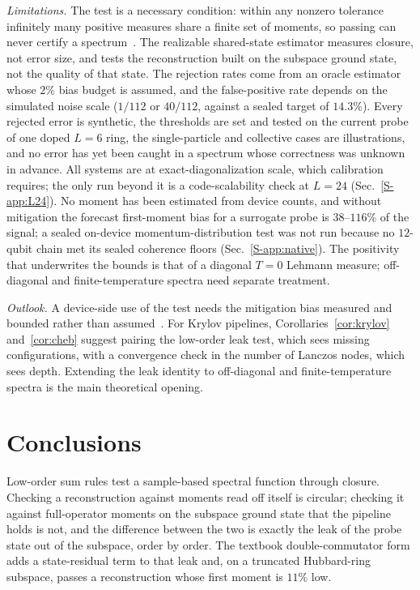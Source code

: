 \documentclass[aps,prb,reprint,onecolumn,12pt,superscriptaddress,longbibliography,floatfix]{revtex4-2}
\begin{document}
\emph{Limitations.}
\label{sec:limitlist}
The test is a necessary condition: within any nonzero tolerance infinitely many positive measures share a finite set of moments, so passing can never certify a spectrum~\cite{ShohatTamarkin1943,Akhiezer1965}. The realizable shared-state estimator measures closure, not error size, and tests the reconstruction built on the subspace ground state, not the quality of that state. The rejection rates come from an oracle estimator whose $2\%$ bias budget is assumed, and the false-positive rate depends on the simulated noise scale ($1/112$ or $40/112$, against a sealed target of $14.3\%$). Every rejected error is synthetic, the thresholds are set and tested on the current probe of one doped $L=6$ ring, the single-particle and collective cases are illustrations, and no error has yet been caught in a spectrum whose correctness was unknown in advance. All systems are at exact-diagonalization scale, which calibration requires; the only run beyond it is a code-scalability check at $L=24$ (Sec.~\ref{S-app:L24}). No moment has been estimated from device counts, and without mitigation the forecast first-moment bias for a surrogate probe is $38$--$116\%$ of the signal; a sealed on-device momentum-distribution test was not run because no $12$-qubit chain met its sealed coherence floors (Sec.~\ref{S-app:native}). The positivity that underwrites the bounds is that of a diagonal $T=0$ Lehmann measure; off-diagonal and finite-temperature spectra need separate treatment.

\emph{Outlook.} A device-side use of the test needs the mitigation bias measured and bounded rather than assumed~\cite{Govia2025,OEACV2026}. For Krylov pipelines, Corollaries~\ref{cor:krylov} and~\ref{cor:cheb} suggest pairing the low-order leak test, which sees missing configurations, with a convergence check in the number of Lanczos nodes, which sees depth. Extending the leak identity to off-diagonal and finite-temperature spectra is the main theoretical opening.

\section{Conclusions}
\label{sec:conclusions}
Low-order sum rules test a sample-based spectral function through closure. Checking a reconstruction against moments read off itself is circular; checking it against full-operator moments on the subspace ground state that the pipeline holds is not, and the difference between the two is exactly the leak of the probe state out of the subspace, order by order. The textbook double-commutator form adds a state-residual term to that leak and, on a truncated Hubbard-ring subspace, passes a reconstruction whose first moment is $11\%$ low.
\end{document}
